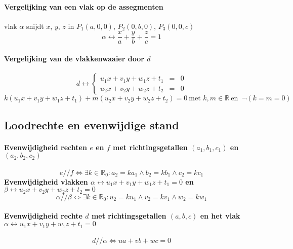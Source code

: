 \paragraph{Vergelijking van een vlak op de assegmenten}
\label{sec:VlakAssegmenten}
 vlak $\alpha$ snijdt $x$, $y$, $z$  in $P_1\left(a,0,0\right)$, $P_2\left(0,b,0\right)$, $P_3\left(0,0,c\right)$
 \[
  \alpha \leftrightarrow \frac{x}{a} + \frac{y}{b} + \frac{z}{c} = 1
 \]

\paragraph{Vergelijking van de vlakkenwaaier door $d$}
\label{sec:Vlakkenwaaier}
   \[
     d \leftrightarrow
     \left\{
       \begin{array}{rcl}
         u_1 x + v_1 y + w_1 z + t_1 & = & 0\\
         u_2 x + v_2 y + w_2 z + t_2 & = & 0
       \end{array}
     \right.
   \]
   \[
     k\left(u_1 x + v_1 y + w_1 z + t_1\right) + m\left(u_2 x + v_2 y + w_2 z + t_2\right) = 0
     \ \textrm{met } k,m \in \mathbb{R} \ \textrm{en } \ \neg\left(k=m=0\right)
   \]

\subsection{Loodrechte en evenwijdige stand}
\label{sec:LoodrechteEnEvenwijdigeStand}

\paragraph{Evenwijdigheid rechten $e$ en $f$ met richtingsgetallen $\left(a_1,b_1,c_1\right)$ en $\left(a_2,b_2,c_2\right)$}
\label{sec:EvenwijdigheidRechten}
   \[
     e // f \Leftrightarrow  \exists k \in \mathbb{R}_0 : a_2 = ka_1 \wedge b_2=kb_1 \wedge c_2=kc_1
   \]
 \textbf{Evenwijdigheid vlakken $\alpha \leftrightarrow u_1 x + v_1 y + w_1 z + t_1 = 0$ 
                          en $\beta  \leftrightarrow u_2 x + v_2 y + w_2 z + t_2 = 0$}
   \[
     \alpha // \beta \Leftrightarrow  \exists k \in \mathbb{R}_0 : u_2 = ku_1 \wedge v_2=kv_1 \wedge w_2=kw_1
   \]
   
\paragraph{Evenwijdigheid rechte $d$ met richtingsgetallen $\left(a,b,c\right)$ en het vlak $\alpha \leftrightarrow u_1 x + v_1 y + w_1 z + t_1 = 0$}
\label{sec:EvenwijdigheidRechteVlak}
   \[
     d // \alpha \Leftrightarrow ua + vb + wc = 0
   \]
   
